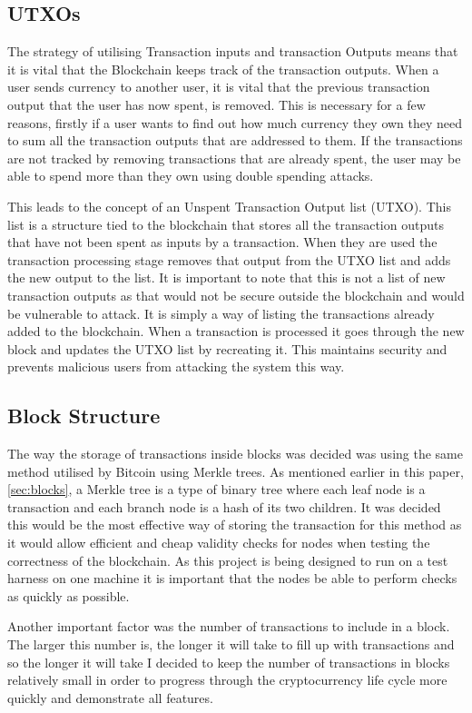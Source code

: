 \documentclass{l4proj}
\begin{document}
\subsection{UTXOs}
The strategy of utilising Transaction inputs and transaction Outputs means that it is vital that the Blockchain
keeps track of the transaction outputs. When a user sends currency to another user, it is vital that the previous 
transaction output that the user has now spent, is removed. This is necessary for a few reasons, 
firstly if a user wants to find out how much currency they own they need to sum all the transaction outputs that 
are addressed to them. If the transactions are not tracked by removing transactions that are already spent, the 
user may be able to spend more than they own using double spending attacks.

This leads to the concept of an Unspent Transaction Output list (UTXO). This list is a structure tied to the blockchain
that stores all the transaction outputs that have not been spent as inputs by a transaction. When they are used 
the transaction processing stage removes that output from the UTXO list and adds the new output to the list.
It is important to note that this is not a list of new transaction outputs as that would not be secure outside the
blockchain and would be vulnerable to attack. It is simply a way of listing the transactions already added to the
blockchain. When a transaction is processed it goes through the new block and updates the UTXO list by recreating 
it. This maintains security and prevents malicious users from attacking the system this way.

\subsection{Block Structure}
The way the storage of transactions inside blocks was decided was using the same method utilised by Bitcoin using
Merkle trees. As mentioned earlier in this paper, \ref{sec:blocks}, a Merkle tree is a type of binary tree where each leaf node
is a transaction and each branch node is a hash of its two children. It was decided this would be the most effective
way of storing the transaction for this method as it would allow efficient and cheap validity checks for nodes
when testing the correctness of the blockchain. As this project is being designed to run on a test harness on one
machine it is important that the nodes be able to perform checks as quickly as possible.

Another important factor was the number of transactions to include in a block. The larger this number is, the
longer it will take to fill up with transactions and so the longer it will take I decided to keep the 
number of transactions in blocks relatively small in order to progress through the cryptocurrency life cycle
more quickly and demonstrate all features.
\end{document}
